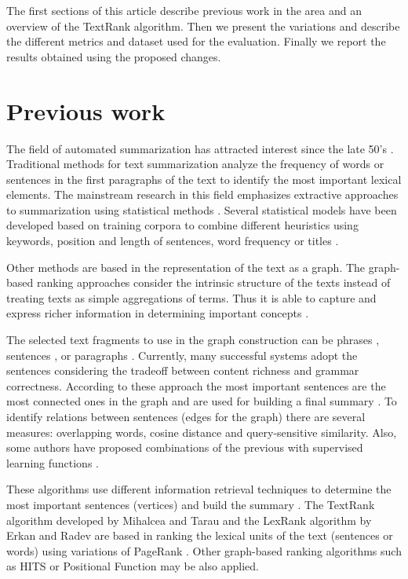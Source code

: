 \documentclass{llncs}
\begin{document}
The first sections of this article describe previous work in the area and an overview of the TextRank algorithm. Then we present the variations and describe the different metrics and dataset used for the evaluation. Finally we report the results obtained using the proposed changes.

\section{Previous work}
The field of automated summarization has attracted interest since the late 50's \cite{luhn}. Traditional methods for text summarization analyze the frequency of words or sentences in the first paragraphs of the text to identify the most important lexical elements. The mainstream research in this field emphasizes extractive approaches to summarization using statistical methods \cite{a_survey}. Several statistical models have been developed based on training corpora to combine different heuristics using keywords, position and length of sentences, word frequency or titles \cite{hovy}. 

Other methods are based in the representation of the text as a graph. The graph-based ranking approaches consider the intrinsic structure of the texts instead of treating texts as simple aggregations of terms. Thus it is able to capture and express richer information in determining important concepts \cite{similarity_functions}.

The selected text fragments to use in the graph construction can be phrases \cite{lexical_chains}, sentences \cite{luhn}, or paragraphs \cite{scalable_summarization}. Currently, many successful systems adopt the sentences considering the tradeoff between content richness and grammar correctness. According to these approach the most important sentences are the most connected ones in the graph and are used for building a final summary \cite{barzilay}. To identify relations between sentences (edges for the graph) there are several measures: overlapping words, cosine distance and query-sensitive similarity. Also, some authors have proposed combinations of the previous with supervised learning functions \cite{similarity_functions}.

These algorithms use different information retrieval techniques to determine the most important sentences (vertices) and build the summary \cite{salton}. The TextRank algorithm developed by Mihalcea and Tarau \cite{mihalcea-tarau} and the LexRank algorithm by Erkan and Radev \cite{erkan} are based in ranking the lexical units of the text (sentences or words) using variations of PageRank \cite{pageetal98}. Other graph-based ranking algorithms such as HITS \cite{kleinberg} or Positional Function \cite{herings} may be also applied.
\end{document}
